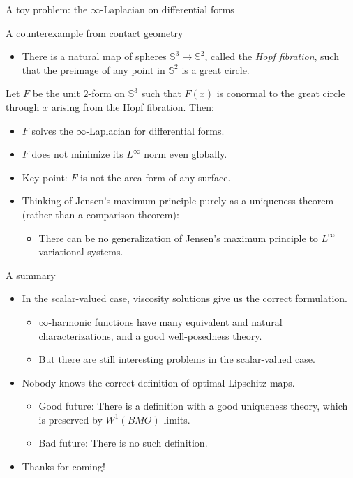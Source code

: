 \documentclass[10pt]{beamer}
\begin{document}
\begin{frame}{A toy problem: the $\infty$-Laplacian on differential forms}

\end{frame}

\begin{frame}{A counterexample from contact geometry}
    \begin{itemize}
        \item There is a natural map of spheres $\mathbb S^3 \to \mathbb S^2$, called the \emph{Hopf fibration}, such that the preimage of any point in $\mathbb S^2$ is a great circle. 
    \end{itemize}

    \begin{example}
    Let $F$ be the unit $2$-form on $\mathbb S^3$ such that $F(x)$ is conormal to the great circle through $x$ arising from the Hopf fibration.
    Then: 
\begin{itemize}
    \item $F$ solves the $\infty$-Laplacian for differential forms.
    \item $F$ does not minimize its $L^\infty$ norm even globally.
\end{itemize}
\end{example}

\begin{itemize}
\item Key point: $F$ is not the area form of any surface.  
\item Thinking of Jensen's maximum principle purely as a uniqueness theorem (rather than a comparison theorem):  
\begin{itemize}
\item There can be no generalization of Jensen's maximum principle to $L^\infty$ variational systems.
\end{itemize}
\end{itemize}
\end{frame}

\begin{frame}{A summary}
\begin{itemize}
\item In the scalar-valued case, viscosity solutions give us the correct formulation.
\begin{itemize}
\item $\infty$-harmonic functions have many equivalent and natural characterizations, and a good well-posedness theory.
\item But there are still interesting problems in the scalar-valued case.
\end{itemize}
\item Nobody knows the correct definition of optimal Lipschitz maps.
\begin{itemize}
    \item Good future: There is a definition with a good uniqueness theory, which is preserved by $W^1(BMO)$ limits.
    \item Bad future: There is no such definition.
\end{itemize}
\item Thanks for coming!
\end{itemize}
\end{frame}
\end{document}
